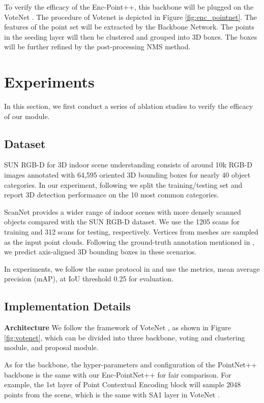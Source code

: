 \documentclass[runningheads]{llncs}
\begin{document}
To verify the efficacy of the Enc-Point++, this backbone will be plugged on the VoteNet \cite{VoteNet}. The procedure of Votenet is depicted in Figure \ref{fig:enc_pointnet}. The features of the point set will be extracted by the Backbone Network. The points in the seeding layer will then be clustered and grouped into 3D boxes. The boxes  will be further refined by the post-processing NMS method.

\section{Experiments}
\label{section:experiment}
In this section, we first conduct a series of ablation studies to verify the efficacy of our module. 

\subsection{Dataset}
SUN RGB-D \cite{SUN_RGBD} for 3D indoor scene understanding consists of around 10k RGB-D images annotated with 64,595 oriented 3D bounding boxes for nearly 40 object categories. In our experiment, following \cite{VoteNet} we split the training/testing set and report 3D detection performance on the 10 most common categories. 

ScanNet \cite{SCannet} provides a wider range of indoor scenes with more densely scanned objects compared with the SUN RGB-D dataset. We use the  1205 scans for training  and 312 scans  for  testing, respectively.  Vertices from meshes  are sampled as the input point clouds. Following the ground-truth annotation mentioned in \cite{VoteNet}, we predict axis-aligned 3D bounding boxes in these scenarios.

In experiments, we follow the same protocol in \cite{VoteNet} and use the metrics, mean average precision (mAP), at IoU threshold 0.25 for evaluation.

\subsection{Implementation Details} 
\noindent\textbf{Architecture}
We  follow the framework of  VoteNet \cite{VoteNet}, as shown in Figure \ref{fig:votenet}, which can be  divided into three   backbone, voting and clustering module, and proposal module.

As for the backbone, the   hyper-parameters and configuration of the PointNet++ backbone is the same with our Enc-PointNet++ for fair comparison. For example, the 1st layer of Point Contextual Encoding block will sample  2048 points from the scene, which is the same with SA1 layer in VoteNet \cite{VoteNet}.
\end{document}
